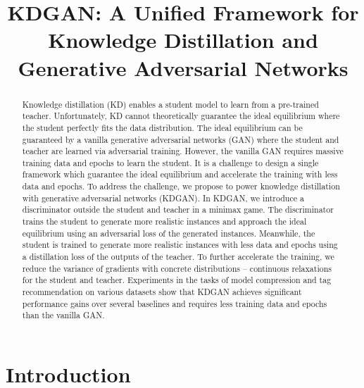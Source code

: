 \documentclass{article}
\title{KDGAN: A Unified Framework for Knowledge Distillation and Generative Adversarial Networks}
\author{
}
\begin{document}

\maketitle


\begin{abstract}
Knowledge distillation (KD) enables a student model to learn from a pre-trained teacher.
Unfortunately, KD cannot theoretically guarantee the ideal equilibrium where the student perfectly fits the data distribution.
The ideal equilibrium can be guaranteed by a vanilla generative adversarial networks (GAN) where the student and teacher are learned via adversarial training.
However, the vanilla GAN requires massive training data and epochs to learn the student.
It is a challenge to design a single framework which guarantee the ideal equilibrium and accelerate the training with less data and epochs.
To address the challenge, we propose to power knowledge distillation with generative adversarial networks (KDGAN).
In KDGAN, we introduce a discriminator outside the student and teacher in a minimax game.
The discriminator trains the student to generate more realistic instances and approach the ideal equilibrium using an adversarial loss of the generated instances.
Meanwhile, the student is trained to generate more realistic instances with less data and epochs using a distillation loss of the outputs of the teacher.
To further accelerate the training, we reduce the variance of gradients with concrete distributions -- continuous relaxations for the student and teacher.
Experiments in the tasks of model compression and tag recommendation on various datasets show that KDGAN achieves significant performance gains over several baselines and requires less training data and epochs than the vanilla GAN.
\end{abstract}


\section{Introduction}
\end{document}
